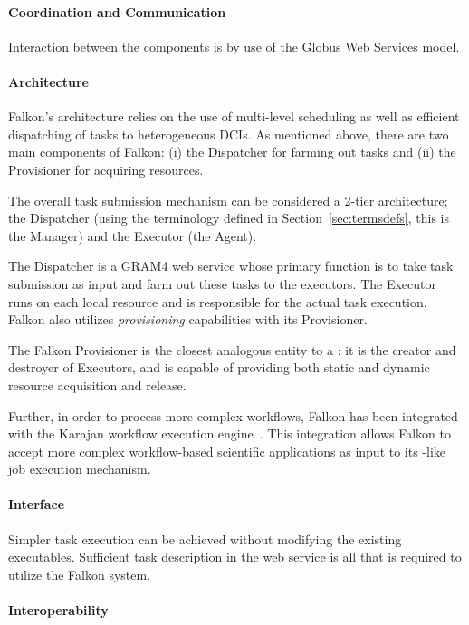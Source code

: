 \documentclass{sig-alternate}
\begin{document}
\paragraph{Coordination and Communication}

Interaction between the components is by use of the Globus Web Services model.

\paragraph{Architecture}

Falkon's architecture relies on the use of multi-level scheduling as well as
efficient dispatching of tasks to heterogeneous DCIs. As mentioned above, there
are two main components of Falkon: (i) the Dispatcher for farming out tasks and
(ii) the Provisioner for acquiring resources.

The overall task submission mechanism can be considered a 2-tier architecture;
the Dispatcher (using the terminology defined in Section~\ref{sec:termsdefs},
this is the \pilot Manager) and the Executor (the \pilot Agent).

The Dispatcher is a GRAM4 web service whose primary function is to take task
submission as input and farm out these tasks to the executors. The Executor
runs on each local resource and is responsible for the actual task execution.
Falkon also utilizes \textit{provisioning} capabilities with its Provisioner.

The Falkon Provisioner is the closest analogous entity to a \pilot: it is the
creator and destroyer of Executors, and is capable of providing both static and
dynamic resource acquisition and release.

Further, in order to process more complex workflows, Falkon has been integrated
with the Karajan workflow execution engine~\cite{karajan}. This integration
allows Falkon to accept more complex workflow-based scientific applications as
input to its \pilot-like job execution mechanism.

\paragraph{Interface}

Simpler task execution can be achieved without modifying the existing
executables. Sufficient task description in the web service is all that is
required to utilize the Falkon system.

\paragraph{Interoperability}
\end{document}
